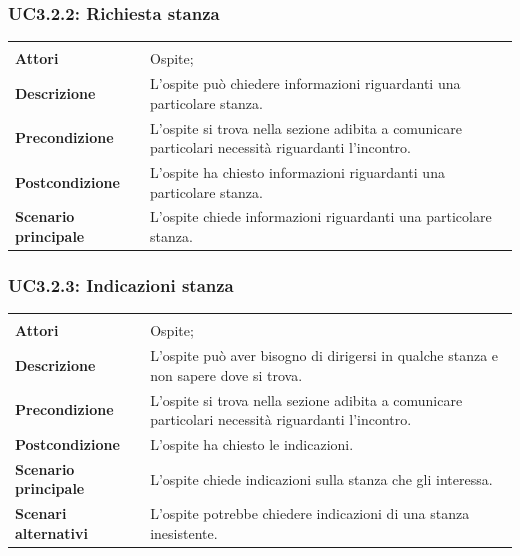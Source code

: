 \subsubsection{UC3.2.2: Richiesta stanza}
\label{UC3.2.2}
\begin{longtable}{l|p{10cm}}
\hline
&\\
\textbf{Attori} & Ospite;\\[7pt]
\textbf{Descrizione} & L'ospite può chiedere informazioni riguardanti una particolare stanza.\\[7pt]
\textbf{Precondizione} & L'ospite si trova nella sezione adibita a comunicare particolari necessità riguardanti l'incontro.\\[7pt]
\textbf{Postcondizione} & L'ospite ha chiesto informazioni riguardanti una particolare stanza.\\[7pt]
\textbf{Scenario principale} & L'ospite chiede informazioni riguardanti una particolare stanza.\\[7pt]\hline
\end{longtable}

\subsubsection{UC3.2.3: Indicazioni stanza}
\label{UC3.2.3}
\begin{longtable}{l|p{10cm}}
\hline
&\\
\textbf{Attori} & Ospite;\\[7pt]
\textbf{Descrizione} & L'ospite può aver bisogno di dirigersi in qualche stanza e non sapere dove si trova.\\[7pt]
\textbf{Precondizione} & L'ospite si trova nella sezione adibita a comunicare particolari necessità riguardanti l'incontro.\\[7pt]
\textbf{Postcondizione} & L'ospite ha chiesto le indicazioni.\\[7pt]
\textbf{Scenario principale} & L'ospite chiede indicazioni sulla stanza che gli interessa.\\[7pt]
\textbf{Scenari alternativi} & L'ospite potrebbe chiedere indicazioni di una stanza inesistente.\\[7pt]\hline
\end{longtable}

